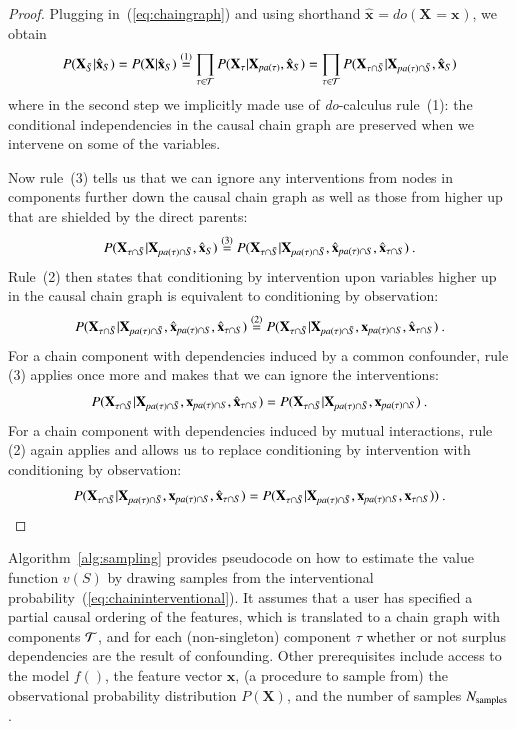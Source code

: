\documentclass{article}
\newcommand{\vX}{\mathbf{X}}
\newcommand{\vx}{\mathbf{x}}
\newcommand{\val}{{v}}
\newcommand{\dodo}{\mathit{do}}
\newcommand{\lvdo}[1]{\dodo(\vX_{#1} = \vx_{#1})}
\newcommand{\svdo}[1]{\hat{\vx}_{#1}}
\newcommand{\spa}{\mathop{\textit{\scriptsize pa}}}
\newcommand{\onder}[2]{{#1}_{\mbox{\scriptsize #2}}}
\newcommand{\chaincomponents}{{\cal T}}
\newcommand{\isequaldono}[1]{\overset{(#1)}{=}}
\begin{document}
\begin{proof}
Plugging in~(\ref{eq:chaingraph}) and using shorthand $\svdo{} = \lvdo{}$, we obtain
\[
P(\vX_{\bar{S}}|\svdo{S}) = P(\vX|\svdo{S})
\isequaldono{1} \prod_{\tau \in \chaincomponents} P(\vX_\tau|\vX_{\spa(\tau)},\svdo{S}) = \prod_{\tau \in \chaincomponents} P(\vX_{\tau \cap \bar{S}}|\vX_{\spa(\tau)  \cap \bar{S}},\svdo{S})
\]
where in the second step we implicitly made use of {\em do}-calculus rule~(1): the conditional independencies in the causal chain graph are preserved when we intervene on some of the variables.

Now rule~(3) tells us that we can ignore any interventions from nodes in components further down the causal chain graph as well as those from higher up that are shielded by the direct parents:
\[
P(\vX_{\tau \cap \bar{S}}|\vX_{\spa(\tau)  \cap \bar{S}},\svdo{S})
\isequaldono{3} P(\vX_{\tau \cap \bar{S}}|\vX_{\spa(\tau)  \cap \bar{S}},\svdo{\spa(\tau) \cap S},\svdo{\tau \cap S}) \: .
\]
Rule~(2) then states that conditioning by intervention upon variables higher up in the causal chain graph is equivalent to conditioning by observation:
\[
P(\vX_{\tau \cap \bar{S}}|\vX_{\spa(\tau)  \cap \bar{S}},\svdo{\spa(\tau) \cap S},\svdo{\tau \cap S}) \isequaldono{2}
P(\vX_{\tau \cap \bar{S}}|\vX_{\spa(\tau)  \cap \bar{S}},\vx_{\spa(\tau) \cap S},\svdo{\tau \cap S}) \: .
\]
For a chain component with dependencies induced by a common confounder, rule (3) applies once more and makes that we can ignore the interventions:
\[
P(\vX_{\tau \cap \bar{S}}|\vX_{\spa(\tau)  \cap \bar{S}},\vx_{\spa(\tau) \cap S},\svdo{\tau \cap S}) = P(\vX_{\tau \cap \bar{S}}|\vX_{\spa(\tau)  \cap \bar{S}},\vx_{\spa(\tau) \cap S}) \: .
\]
For a chain component with dependencies induced by mutual interactions, rule (2) again applies and allows us to replace conditioning by intervention with conditioning by observation:
\[
P(\vX_{\tau \cap \bar{S}}|\vX_{\spa(\tau)  \cap \bar{S}},\vx_{\spa(\tau) \cap S},\svdo{\tau \cap S}) = P(\vX_{\tau \cap \bar{S}}|\vX_{\spa(\tau)  \cap \bar{S}},\vx_{ \spa(\tau) \cap S},\vx_{\tau \cap S})) \: .
\]
\end{proof}

Algorithm~\ref{alg:sampling} provides pseudocode on how to estimate the value function $\val(S)$ by drawing samples from the interventional probability~(\ref{eq:chaininterventional}). It assumes that a user has specified a partial causal ordering of the features, which is translated to a chain graph with components $\chaincomponents$, and for each (non-singleton) component $\tau$ whether or not surplus dependencies are the result of confounding. Other prerequisites include access to the model $f()$, the feature vector $\vx$, (a procedure to sample from) the observational probability distribution $P(\vX)$, and the number of samples $\onder{N}{samples}$.
\end{document}
